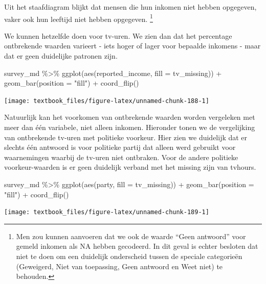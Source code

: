 \documentclass[]{tufte-book}
\newenvironment{Shaded}{}{}
\newcommand{\AttributeTok}[1]{\textcolor[rgb]{0.49,0.56,0.16}{#1}}
\newcommand{\FunctionTok}[1]{\textcolor[rgb]{0.02,0.16,0.49}{#1}}
\newcommand{\NormalTok}[1]{#1}
\newcommand{\SpecialCharTok}[1]{\textcolor[rgb]{0.25,0.44,0.63}{#1}}
\newcommand{\StringTok}[1]{\textcolor[rgb]{0.25,0.44,0.63}{#1}}
\begin{document}
Uit het staafdiagram blijkt dat mensen die hun inkomen niet hebben opgegeven, vaker ook hun leeftijd niet hebben opgegeven. \footnote{Men zou kunnen aanvoeren dat we ook de waarde ``Geen antwoord'' voor gemeld inkomen als NA hebben gecodeerd. In dit geval is echter besloten dat niet te doen om een duidelijk onderscheid tussen de speciale categorieën (Geweigerd, Niet van toepassing, Geen antwoord en Weet niet) te behouden.}

We kunnen hetzelfde doen voor tv-uren. We zien dan dat het percentage ontbrekende waarden varieert - iets hoger of lager voor bepaalde inkomens - maar dat er geen duidelijke patronen zijn.

\begin{Shaded}
\begin{Highlighting}[]
\NormalTok{survey\_md }\SpecialCharTok{\%\textgreater{}\%}
  \FunctionTok{ggplot}\NormalTok{(}\FunctionTok{aes}\NormalTok{(reported\_income, }\AttributeTok{fill =}\NormalTok{ tv\_missing)) }\SpecialCharTok{+}
  \FunctionTok{geom\_bar}\NormalTok{(}\AttributeTok{position =} \StringTok{"fill"}\NormalTok{) }\SpecialCharTok{+}
  \FunctionTok{coord\_flip}\NormalTok{()}
\end{Highlighting}
\end{Shaded}

\texttt{[image: textbook\_files/figure-latex/unnamed-chunk-188-1]}

Natuurlijk kan het voorkomen van ontbrekende waarden worden vergeleken met meer dan één variabele, niet alleen inkomen. Hieronder tonen we de vergelijking van ontbrekende tv-uren met politieke voorkeur. Hier zien we duidelijk dat er slechts één antwoord is voor politieke partij dat alleen werd gebruikt voor waarnemingen waarbij de tv-uren niet ontbraken. Voor de andere politieke voorkeur-waarden is er geen duidelijk verband met het missing zijn van tvhours.

\begin{Shaded}
\begin{Highlighting}[]
\NormalTok{survey\_md }\SpecialCharTok{\%\textgreater{}\%}
  \FunctionTok{ggplot}\NormalTok{(}\FunctionTok{aes}\NormalTok{(party, }\AttributeTok{fill =}\NormalTok{ tv\_missing)) }\SpecialCharTok{+}
  \FunctionTok{geom\_bar}\NormalTok{(}\AttributeTok{position =} \StringTok{"fill"}\NormalTok{) }\SpecialCharTok{+}
  \FunctionTok{coord\_flip}\NormalTok{()}
\end{Highlighting}
\end{Shaded}

\texttt{[image: textbook\_files/figure-latex/unnamed-chunk-189-1]}
\end{document}
